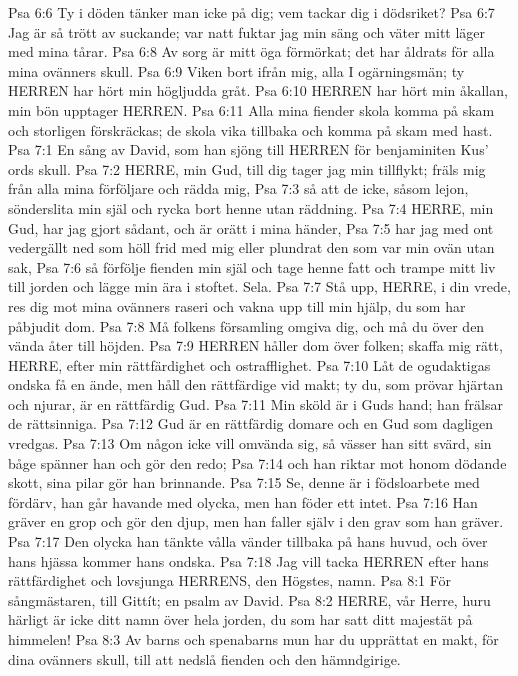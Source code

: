 Psa 6:6  Ty i döden tänker man icke på dig; vem tackar dig i dödsriket?
Psa 6:7  Jag är så trött av suckande; var natt fuktar jag min säng och väter mitt läger med mina tårar.
Psa 6:8  Av sorg är mitt öga förmörkat; det har åldrats för alla mina ovänners skull.
Psa 6:9  Viken bort ifrån mig, alla I ogärningsmän; ty HERREN har hört min högljudda gråt.
Psa 6:10  HERREN har hört min åkallan, min bön upptager HERREN.
Psa 6:11  Alla mina fiender skola komma på skam och storligen förskräckas; de skola vika tillbaka och komma på skam med hast.
Psa 7:1  En sång av David, som han sjöng till HERREN för benjaminiten Kus' ords skull.
Psa 7:2  HERRE, min Gud, till dig tager jag min tillflykt; fräls mig från alla mina förföljare och rädda mig,
Psa 7:3  så att de icke, såsom lejon, sönderslita min själ och rycka bort henne utan räddning.
Psa 7:4  HERRE, min Gud, har jag gjort sådant, och är orätt i mina händer,
Psa 7:5  har jag med ont vedergällt ned som höll frid med mig eller plundrat den som var min ovän utan sak,
Psa 7:6  så förfölje fienden min själ och tage henne fatt och trampe mitt liv till jorden och lägge min ära i stoftet. Sela.
Psa 7:7  Stå upp, HERRE, i din vrede, res dig mot mina ovänners raseri och vakna upp till min hjälp, du som har påbjudit dom.
Psa 7:8  Må folkens församling omgiva dig, och må du över den vända åter till höjden.
Psa 7:9  HERREN håller dom över folken; skaffa mig rätt, HERRE, efter min rättfärdighet och ostrafflighet.
Psa 7:10  Låt de ogudaktigas ondska få en ände, men håll den rättfärdige vid makt; ty du, som prövar hjärtan och njurar, är en rättfärdig Gud.
Psa 7:11  Min sköld är i Guds hand; han frälsar de rättsinniga.
Psa 7:12  Gud är en rättfärdig domare och en Gud som dagligen vredgas.
Psa 7:13  Om någon icke vill omvända sig, så vässer han sitt svärd, sin båge spänner han och gör den redo;
Psa 7:14  och han riktar mot honom dödande skott, sina pilar gör han brinnande.
Psa 7:15  Se, denne är i födsloarbete med fördärv, han går havande med olycka, men han föder ett intet.
Psa 7:16  Han gräver en grop och gör den djup, men han faller själv i den grav som han gräver.
Psa 7:17  Den olycka han tänkte vålla vänder tillbaka på hans huvud, och över hans hjässa kommer hans ondska.
Psa 7:18  Jag vill tacka HERREN efter hans rättfärdighet och lovsjunga HERRENS, den Högstes, namn.
Psa 8:1  För sångmästaren, till Gittít; en psalm av David.
Psa 8:2  HERRE, vår Herre, huru härligt är icke ditt namn över hela jorden, du som har satt ditt majestät på himmelen!
Psa 8:3  Av barns och spenabarns mun har du upprättat en makt, för dina ovänners skull, till att nedslå fienden och den hämndgirige.
